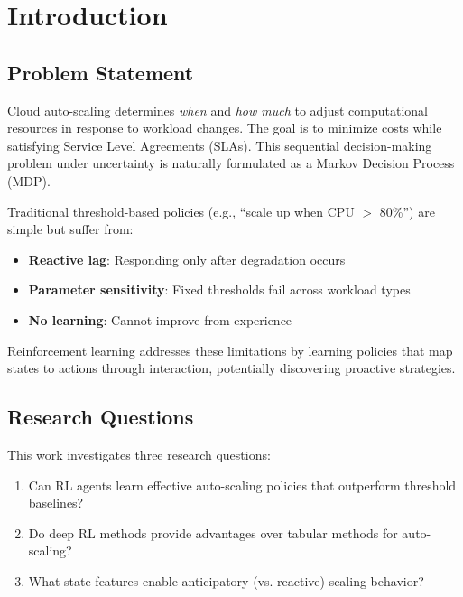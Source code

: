\documentclass[conference]{IEEEtran}
\begin{document}
\section{Introduction}

\subsection{Problem Statement}
Cloud auto-scaling determines \textit{when} and \textit{how much} to adjust computational resources in response to workload changes. The goal is to minimize costs while satisfying Service Level Agreements (SLAs). This sequential decision-making problem under uncertainty is naturally formulated as a Markov Decision Process (MDP).

Traditional threshold-based policies (e.g., ``scale up when CPU $>$ 80\%'') are simple but suffer from:
\begin{itemize}
    \item \textbf{Reactive lag}: Responding only after degradation occurs
    \item \textbf{Parameter sensitivity}: Fixed thresholds fail across workload types
    \item \textbf{No learning}: Cannot improve from experience
\end{itemize}

Reinforcement learning addresses these limitations by learning policies that map states to actions through interaction, potentially discovering proactive strategies.

\subsection{Research Questions}
This work investigates three research questions:
\begin{enumerate}
    \item[\textbf{RQ1}:] Can RL agents learn effective auto-scaling policies that outperform threshold baselines?
    \item[\textbf{RQ2}:] Do deep RL methods provide advantages over tabular methods for auto-scaling?
    \item[\textbf{RQ3}:] What state features enable anticipatory (vs. reactive) scaling behavior?
\end{enumerate}
\end{document}
